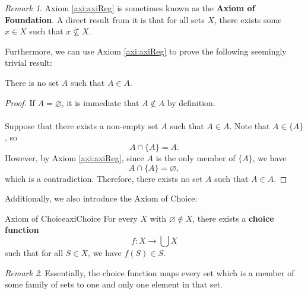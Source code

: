 \documentclass[math]{amznotes}
\theoremstyle{remark}
\newtheorem*{remark}{Remark}
\begin{document}
\begin{notebox}
    \begin{remark}
        Axiom \ref{axi:axiReg} is sometimes known as the {\color{red} \textbf{Axiom of Foundation}}. A direct result from it is that for all sets $X$, there exists some $x \in X$ such that $x \not\subseteq X$.
    \end{remark}
\end{notebox}
Furthermore, we can use Axiom \ref{axi:axiReg} to prove the following seemingly trivial result:
\begin{thmbox}{}{}
    There is no set $A$ such that $A \in A$.
    \tcblower   
    \begin{proof}
        If $A = \varnothing$, it is immediate that $A \notin A$ by definition.
        \\\\
        Suppose that there exists a non-empty set $A$ such that $A \in A$. Note that $A \in \{A\}$, so 
        \begin{equation*}
            A \cap \{A\} = A.
        \end{equation*}
        However, by Axiom \ref{axi:axiReg}, since $A$ is the only member of $\{A\}$, we have 
        \begin{equation*}
            A \cap \{A\} = \varnothing,
        \end{equation*}
        which is a contradiction. Therefore, there exists no set $A$ such that $A \in A$.
    \end{proof}
\end{thmbox}
Additionally, we also introduce the Axiom of Choice:
\begin{axibox}{Axiom of Choice}{axiChoice}
    For every $X$ with $\varnothing \notin X$, there exists a {\color{red} \textbf{choice function}}
    \begin{displaymath}
        f \colon X \to \bigcup X
    \end{displaymath}
    such that for all $S \in X$, we have $f(S) \in S$.
\end{axibox}
\begin{notebox}
    \begin{remark}
        Essentially, the choice function maps every set which is a member of some family of sets to one and only one element in that set.
    \end{remark}
\end{notebox}
\end{document}
